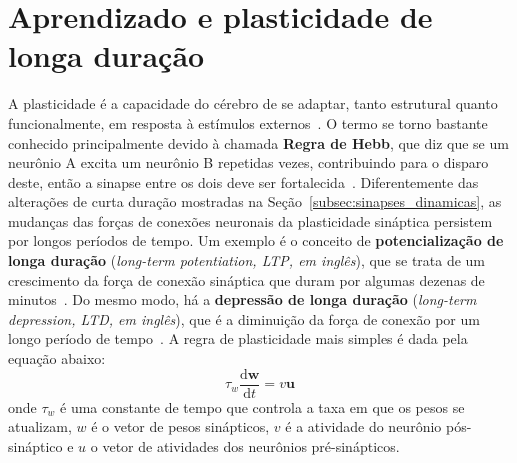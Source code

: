 \section{Aprendizado e plasticidade de longa duração}\label{sec:aprendizado}

A plasticidade é a capacidade do cérebro de se adaptar, tanto estrutural quanto funcionalmente, em resposta à estímulos externos~\cite{mateos-aparicio_impact_2019}. O termo se torno bastante conhecido principalmente devido à chamada \textbf{Regra de Hebb}, que diz que se um neurônio A excita um neurônio B repetidas vezes, contribuindo para o disparo deste, então a sinapse entre os dois deve ser fortalecida~\cite{hebb_organization_2005}. Diferentemente das alterações de curta duração mostradas na Seção~\ref{subsec:sinapses_dinamicas}, as mudanças das forças de conexões neuronais da plasticidade sináptica persistem por longos períodos de tempo. Um exemplo é o conceito de \textbf{potencialização de longa duração} (\textit{long-term potentiation, LTP, em inglês}), que se trata de um crescimento da força de conexão sináptica que duram por algumas dezenas de minutos~\cite{bliss_longlasting_1973}. Do mesmo modo, há a \textbf{depressão de longa duração} (\textit{long-term depression, LTD, em inglês}), que é a diminuição da força de conexão por um longo período de tempo~\cite{bear_long-term_1996}. A regra de plasticidade mais simples é dada pela equação abaixo:
\begin{equation}\label{eq:regra_hebb}
	\tau_w\dfrac{\mathrm{d}\mathbf{w}}{\mathrm{d}t}=v\mathbf{u}
\end{equation}
onde $\tau_w$ é uma constante de tempo que controla a taxa em que os pesos se atualizam, $w$ é o vetor de pesos sinápticos, $v$ é a atividade do neurônio pós-sináptico e $u$ o vetor de atividades dos neurônios pré-sinápticos.

